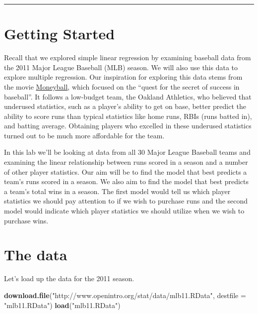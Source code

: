 \documentclass[]{book}
\newenvironment{Shaded}{\begin{snugshade}}{\end{snugshade}}
\newcommand{\DataTypeTok}[1]{\textcolor[rgb]{0.13,0.29,0.53}{#1}}
\newcommand{\KeywordTok}[1]{\textcolor[rgb]{0.13,0.29,0.53}{\textbf{#1}}}
\newcommand{\NormalTok}[1]{#1}
\newcommand{\StringTok}[1]{\textcolor[rgb]{0.31,0.60,0.02}{#1}}
\theoremstyle{definition}
\theoremstyle{definition}
\theoremstyle{definition}
\theoremstyle{remark}
\begin{document}
\begin{center}\rule{0.5\linewidth}{\linethickness}\end{center}

\hypertarget{getting-started-4}{%
\section{Getting Started}\label{getting-started-4}}

Recall that we explored simple linear regression by examining baseball
data from the 2011 Major League Baseball (MLB) season. We will also use
this data to explore multiple regression. Our inspiration for exploring
this data stems from the movie
\href{http://en.wikipedia.org/wiki/Moneyball_(film)}{Moneyball}, which
focused on the ``quest for the secret of success in baseball''. It
follows a low-budget team, the Oakland Athletics, who believed that
underused statistics, such as a player's ability to get on base, better
predict the ability to score runs than typical statistics like home
runs, RBIs (runs batted in), and batting average. Obtaining players who
excelled in these underused statistics turned out to be much more
affordable for the team.

In this lab we'll be looking at data from all 30 Major League Baseball
teams and examining the linear relationship between runs scored in a
season and a number of other player statistics. Our aim will be to find
the model that best predicts a team's runs scored in a season. We also
aim to find the model that best predicts a team's total wins in a
season. The first model would tell us which player statistics we should
pay attention to if we wish to purchase runs and the second model would
indicate which player statistics we should utilize when we wish to
purchase wins.

\hypertarget{the-data-5}{%
\section{The data}\label{the-data-5}}

Let's load up the data for the 2011 season.

\begin{Shaded}
\begin{Highlighting}[]
\KeywordTok{download.file}\NormalTok{(}\StringTok{"http://www.openintro.org/stat/data/mlb11.RData"}\NormalTok{, }\DataTypeTok{destfile =} \StringTok{"mlb11.RData"}\NormalTok{)}
\KeywordTok{load}\NormalTok{(}\StringTok{"mlb11.RData"}\NormalTok{)}
\end{Highlighting}
\end{Shaded}
\end{document}
